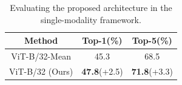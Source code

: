 \begin{table}[tb!]
\center
\caption{Evaluating the proposed architecture in the single-modality framework.}

\begin{tabular}{c|cc}
  \toprule
  Method & Top-1(\%) & Top-5(\%) \\
  \midrule
  ViT-B/32-Mean & 45.3 & 68.5 \\
  ViT-B/32 (Ours) & \textbf{47.8}\scriptsize(+2.5) & \textbf{71.8}\scriptsize(+3.3) \\
  \bottomrule
\end{tabular}

\label{tab:simple}

\end{table}